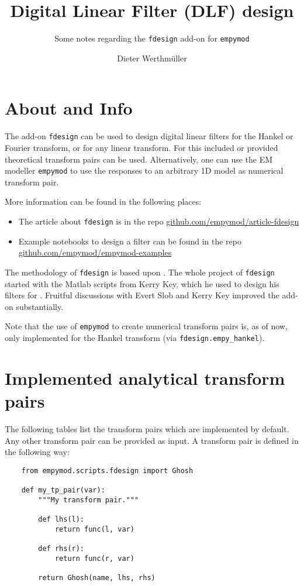 \documentclass[fontsize=9pt, parskip=half, notitlepage, fleqn]{scrartcl}
\title{Digital Linear Filter (DLF) design}
\author{Dieter Werthmüller}
\subtitle{Some notes regarding the \texttt{fdesign} add-on for \texttt{empymod}}
\begin{document}
\maketitle

\section{About and Info}

The add-on \texttt{fdesign} can be used to design digital linear filters for
the Hankel or Fourier transform, or for any linear transform. For this included
or provided theoretical transform pairs can be used. Alternatively, one can use
the EM modeller \texttt{empymod} \citep{GEO.17.Werthmuller} to use the
responses to an arbitrary 1D model as numerical transform pair.

More information can be found in the following places:

\begin{itemize}
  \item The article about \texttt{fdesign} is in the repo
    \href{https://github.com/empymod/article-fdesign}{github.com/empymod/article-fdesign}
  \item Example notebooks to design a filter can be found in the repo
    \href{https://github.com/empymod/empymod-examples}{github.com/empymod/empymod-examples}
\end{itemize}


The methodology of \texttt{fdesign} is based upon \cite{GP.07.Kong}. The whole
project of \texttt{fdesign} started with the Matlab scripts from Kerry Key,
which he used to design his filters for \cite{GEO.09.Key, GEO.12.Key}. Fruitful
discussions with Evert Slob and Kerry Key improved the add-on substantially.

Note that the use of \texttt{empymod} to create numerical transform pairs is,
as of now, only implemented for the Hankel transform (via
\texttt{fdesign.empy\_hankel}).

\section{Implemented analytical transform pairs}

The following tables list the transform pairs which are implemented by default.
Any other transform pair can be provided as input. A transform pair is defined
in the following way:
\begin{verbatim}
    from empymod.scripts.fdesign import Ghosh

    def my_tp_pair(var):
        """My transform pair."""

        def lhs(l):
            return func(l, var)

        def rhs(r):
            return func(r, var)

        return Ghosh(name, lhs, rhs)
\end{verbatim}
\end{document}
